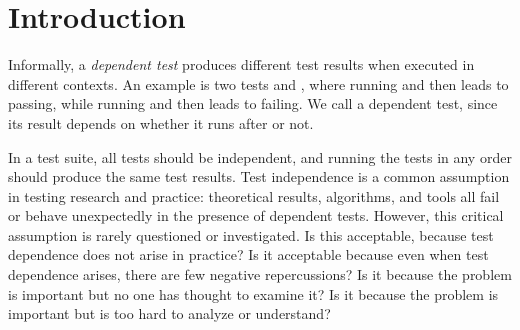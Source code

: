 \section{Introduction}


Informally, a \emph{dependent test} produces different test
results when executed in different contexts.
An example is two tests 
and , where running  and then  leads
to  passing, while running  and then
 leads to  failing. We call 
a dependent test, since its result depends on
whether it runs after  or not.






In a test suite, all tests should be independent, and
running the tests in any order should produce the same test results.
Test independence is a common assumption in testing research and practice:
theoretical results, algorithms, and tools all fail or behave unexpectedly
in the presence of dependent tests.
However, this critical assumption is rarely questioned or investigated.
Is this acceptable, because test dependence does
not arise in practice?
Is it acceptable because even when test dependence arises, there are few
negative repercussions?
Is it because the problem is important but no one has thought to examine it?
Is it because the problem is important but is too hard to analyze or understand?

